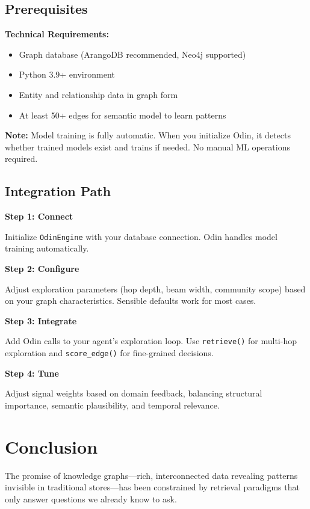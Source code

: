 \documentclass[11pt]{article}
\begin{document}
\subsection{Prerequisites}

\textbf{Technical Requirements:}
\begin{itemize}
\item Graph database (ArangoDB recommended, Neo4j supported)
\item Python 3.9+ environment
\item Entity and relationship data in graph form
\item At least 50+ edges for semantic model to learn patterns
\end{itemize}

\textbf{Note:} Model training is fully automatic. When you initialize Odin, it detects whether trained models exist and trains if needed. No manual ML operations required.

\subsection{Integration Path}

\textbf{Step 1: Connect}

Initialize \texttt{OdinEngine} with your database connection. Odin handles model training automatically.

\textbf{Step 2: Configure}

Adjust exploration parameters (hop depth, beam width, community scope) based on your graph characteristics. Sensible defaults work for most cases.

\textbf{Step 3: Integrate}

Add Odin calls to your agent's exploration loop. Use \texttt{retrieve()} for multi-hop exploration and \texttt{score\_edge()} for fine-grained decisions.

\textbf{Step 4: Tune}

Adjust signal weights based on domain feedback, balancing structural importance, semantic plausibility, and temporal relevance.

\section{Conclusion}

The promise of knowledge graphs—rich, interconnected data revealing patterns invisible in traditional stores—has been constrained by retrieval paradigms that only answer questions we already know to ask.
\end{document}

